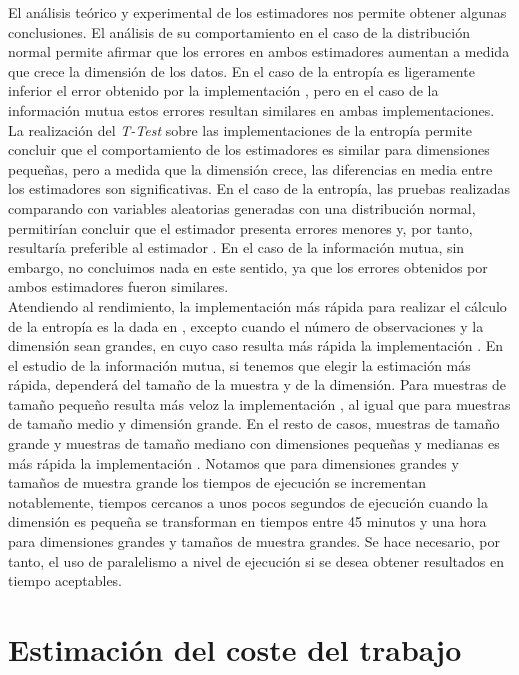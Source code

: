 \documentclass[12pt,a4paper]{report} %
\theoremstyle{definition}
\begin{document}
El análisis teórico y experimental de los estimadores nos permite obtener algunas conclusiones. El análisis de su comportamiento en el caso de la distribución normal permite afirmar que los errores en ambos estimadores aumentan a medida que crece la dimensión de los datos. En el caso de la entropía es ligeramente inferior el error obtenido por la implementación \cite{estimating}, pero en el caso de la información mutua estos errores resultan similares en ambas implementaciones.\\

La realización del \textit{T-Test} sobre las implementaciones de la entropía permite concluir que el comportamiento de los estimadores es similar para dimensiones pequeñas, pero a medida que la dimensión crece, las diferencias en media entre los estimadores son significativas. En el caso de la entropía, las pruebas realizadas comparando con variables aleatorias generadas con una distribución normal, permitirían concluir que el estimador \cite{estimating} presenta errores menores y, por tanto, resultaría preferible al estimador \cite{npeet}. En el caso de la información mutua, sin embargo, no concluimos nada en este sentido, ya que los errores obtenidos por ambos estimadores fueron similares.\\

Atendiendo al rendimiento, la implementación más rápida para realizar el cálculo de la entropía es la dada en \cite{npeet}, excepto cuando el número de observaciones y la dimensión sean grandes, en cuyo caso resulta más rápida la implementación \cite{estimating}. En el estudio de la información mutua, si tenemos que elegir la estimación más rápida, dependerá del tamaño de la muestra y de la dimensión. Para muestras de tamaño pequeño resulta más veloz la implementación \cite{npeet}, al igual que para muestras de tamaño medio y dimensión grande. En el resto de casos, muestras de tamaño grande y muestras de tamaño mediano con dimensiones pequeñas y medianas es más rápida la implementación \cite{estimating}. Notamos que para dimensiones grandes y tamaños de muestra grande los tiempos de ejecución se incrementan notablemente, tiempos cercanos a unos pocos segundos de ejecución cuando la dimensión es pequeña se transforman en tiempos entre 45 minutos y una hora para dimensiones grandes y tamaños de muestra grandes. Se hace necesario, por tanto, el uso de paralelismo a nivel de ejecución si se desea obtener resultados en tiempo aceptables.\\

\chapter{Estimación del coste del trabajo}
\end{document}
